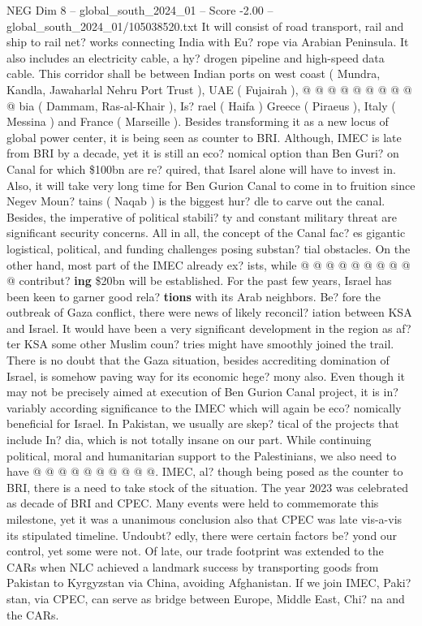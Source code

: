 \begin{textsample}{NEG Dim 8 – global\_south\_2024\_01 – Score -2.00 – global\_south\_2024\_01/105038520.txt}
It will consist of road transport, rail and ship to rail net? works connecting India with Eu? rope via Arabian Peninsula.
It also includes an electricity cable, a hy? drogen pipeline and high-speed data cable.
This corridor shall be between Indian ports on west coast ( Mundra, Kandla, Jawaharlal Nehru Port Trust ), UAE ( Fujairah ), @ @ @ @ @ @ @ @ @ @ bia ( Dammam, Ras-al-Khair ), Is? rael ( Haifa ) Greece ( Piraeus ), Italy ( Messina ) and France ( Marseille ).
Besides transforming it as a new locus of global power center, it is being seen as counter to BRI.
Although, IMEC is late from BRI by a decade, yet it is still an eco? nomical option than Ben Guri? on Canal for which \$100bn are re? quired, that Isarel alone will have to invest in.
Also, it will take very long time for Ben Gurion Canal to come in to fruition since Negev Moun? tains ( Naqab ) is the biggest hur? dle to carve out the canal.
Besides, the imperative of political stabili? ty and constant military threat are significant security concerns.
All in all, the concept of the Canal fac? es gigantic logistical, political, and funding challenges posing substan? tial obstacles.
On the other hand, most part of the IMEC already ex? ists, while @ @ @ @ @ @ @ @ @ @ contribut? \textbf{ing} \$20bn will be established.
For the past few years, Israel has been keen to garner good rela? \textbf{tions} with its Arab neighbors.
Be? fore the outbreak of Gaza conflict, there were news of likely reconcil? iation between KSA and Israel.
It would have been a very significant development in the region as af? ter KSA some other Muslim coun? tries might have smoothly joined the trail.
There is no doubt that the Gaza situation, besides accrediting domination of Israel, is somehow paving way for its economic hege? mony also.
Even though it may not be precisely aimed at execution of Ben Gurion Canal project, it is in? variably according significance to the IMEC which will again be eco? nomically beneficial for Israel.
In Pakistan, we usually are skep? tical of the projects that include In? dia, which is not totally insane on our part.
While continuing political, moral and humanitarian support to the Palestinians, we also need to have @ @ @ @ @ @ @ @ @ @.
IMEC, al? though being posed as the counter to BRI, there is a need to take stock of the situation.
The year 2023 was celebrated as decade of BRI and CPEC.
Many events were held to commemorate this milestone, yet it was a unanimous conclusion also that CPEC was late vis-a-vis its stipulated timeline.
Undoubt? edly, there were certain factors be? yond our control, yet some were not.
Of late, our trade footprint was extended to the CARs when NLC achieved a landmark success by transporting goods from Pakistan to Kyrgyzstan via China, avoiding Afghanistan.
If we join IMEC, Paki? stan, via CPEC, can serve as bridge between Europe, Middle East, Chi? na and the CARs.

\end{textsample}
